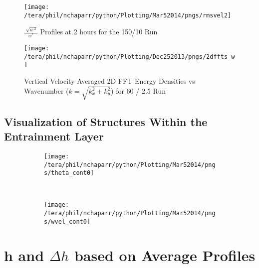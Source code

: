 \begin{figure}[!ht]
    \centering
    \texttt{[image: /tera/phil/nchaparr/python/Plotting/Mar52014/pngs/rmsvel2]}
    \caption{$\frac{\sqrt[]{u^{,2}}}{w^{*}}$ Profiles at 2 hours for the 150/10 Run}
    \label{fig:rmsvel150102hrs}   %
\end{figure}

\begin{figure}[!ht]
    \centering
    \texttt{[image: /tera/phil/nchaparr/python/Plotting/Dec252013/pngs/2dffts\_w]}
    \caption{Vertical Velocity Averaged 2D FFT Energy Densities vs Wavenumber ($k = \sqrt{k_{x}^{2}+k_{y}^{2}}$) for 60 / 2.5 Run}
    \label{fig:2dfftw602point5}   %
\end{figure}

\subsection{Visualization of Structures Within the Entrainment Layer}

\begin{figure}
        \centering
        \begin{subfigure}[b]{0.5\textwidth}
                \texttt{[image: /tera/phil/nchaparr/python/Plotting/Mar52014/pngs/theta\_cont0]}
                \caption{}
                \label{fig:}
        \end{subfigure}%
        ~ %
        \begin{subfigure}[b]{0.5\textwidth}
                \texttt{[image: /tera/phil/nchaparr/python/Plotting/Mar52014/pngs/wvel\_cont0]}
                \caption{}
                \label{fig:tiger}
        \end{subfigure}
        \caption{}\label{fig:}
\end{figure}


\section{h and  $\Delta h$ based on Average Profiles}
\label{sec:hdeltahavprofs}     




